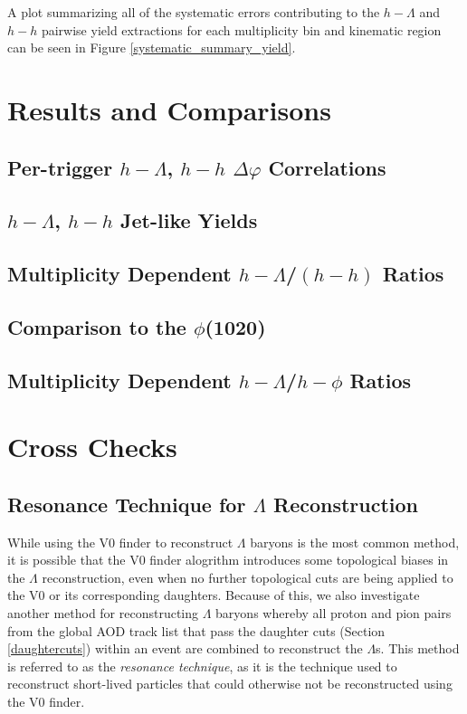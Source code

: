 \documentclass[ALICE,manyauthors]{ALICE_analysis_notes}
\begin{document}
A plot summarizing all of the systematic errors contributing to the $h-\Lambda$ and $h-h$ pairwise yield extractions for each multiplicity bin and kinematic region can be seen in Figure \ref{systematic_summary_yield}. 



\section{Results and Comparisons}
\label{results}
\subsection{Per-trigger $h-\Lambda$, $h-h$ $\Delta\varphi$ Correlations}
\subsection{$h-\Lambda$, $h-h$ Jet-like Yields}
\subsection{Multiplicity Dependent $h-\Lambda$/$(h-h)$ Ratios}
\subsection{Comparison to the $\phi$(1020)}
\subsection{Multiplicity Dependent $h-\Lambda$/$h-\phi$ Ratios}

\section{Cross Checks}
\subsection{Resonance Technique for $\Lambda$ Reconstruction}
\label{resonance_technique}

While using the V0 finder to reconstruct $\Lambda$ baryons is the most common method, it is possible that the V0 finder alogrithm introduces some topological biases in the $\Lambda$ reconstruction, even when no further topological cuts are being applied to the V0 or its corresponding daughters. Because of this, we also investigate another method for reconstructing $\Lambda$ baryons whereby all proton and pion pairs from the global AOD track list that pass the daughter cuts (Section \ref{daughtercuts}) within an event are combined to reconstruct the $\Lambda$s. This method is referred to as the \textit{resonance technique}, as it is the technique used to reconstruct short-lived particles that could otherwise not be reconstructed using the V0 finder.
\end{document}
